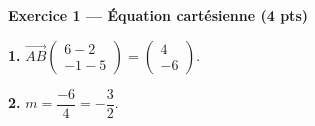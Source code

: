 %
%
%
%
%


\textbf{Exercice 1 — Équation cartésienne (4 pts)}


\textbf{1.} $\vec{AB}\begin{pmatrix} 6-2 \\ -1-5 \end{pmatrix} = \begin{pmatrix} 4 \\ -6 \end{pmatrix}$.

\textbf{2.} $m = \dfrac{-6}{4} = -\dfrac{3}{2}$.

